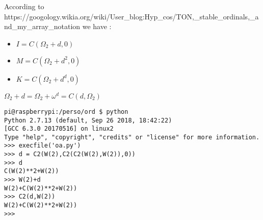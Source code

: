 \documentclass[10pt]{article}
\begin{document}
According to  https://googology.wikia.org/wiki/User\_blog:Hyp\_cos/TON,\_stable\_ordinals,\_and\_my\_array\_notation we have :

\begin{itemize}
 \item $I = C(\Omega_2+d,0)$
 \item $M = C(\Omega_2+d^2,0)$
 \item $K = C(\Omega_2+d^d,0)$
\end{itemize}

$\Omega_2 + d = \Omega_2 + \omega^d = C(d,\Omega_2)$

\begin{verbatim}
pi@raspberrypi:/perso/ord $ python
Python 2.7.13 (default, Sep 26 2018, 18:42:22)
[GCC 6.3.0 20170516] on linux2
Type "help", "copyright", "credits" or "license" for more information.
>>> execfile('oa.py')
>>> d = C2(W(2),C2(C2(W(2),W(2)),0))
>>> d
C(W(2)**2+W(2))
>>> W(2)+d
W(2)+C(W(2)**2+W(2))
>>> C2(d,W(2))
W(2)+C(W(2)**2+W(2))
>>>
\end{verbatim}
\end{document}
